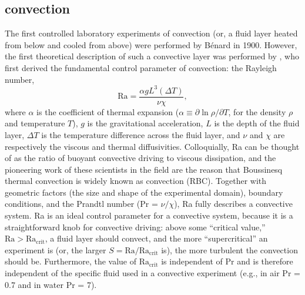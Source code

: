\subsection{\RB convection}
The first controlled laboratory experiments of convection (or, a fluid layer heated from below and cooled from above) were performed by B\'{e}nard in 1900.
However, the first theoretical description of such a convective layer was performed by \citet{rayleigh1916}, who first derived the fundamental control parameter of convection: the Rayleigh number,
\begin{equation}
\text{Ra} = \frac{\alpha g L^3 (\Delta T)}{\nu \chi},
\label{eqn:rayleigh_number}
\end{equation}
where $\alpha$ is the coefficient of thermal expansion ($\alpha \equiv \partial \ln \rho / \partial T$, for the density $\rho$ and temperature $T$), $g$ is the gravitational acceleration, $L$ is the depth of the fluid layer, $\Delta T$ is the temperature difference across the fluid layer, and $\nu$ and $\chi$ are respectively the viscous and thermal diffusivities.
Colloquially, Ra can be thought of as the ratio of buoyant convective driving to viscous dissipation, and the pioneering work of these scientists in the field are the reason that Boussinesq thermal convection is widely known as \RB convection (RBC).
Together with geometric factors (the size and shape of the experimental domain), boundary conditions, and the Prandtl number (Pr = $\nu/\chi$), Ra fully describes a convective system.
Ra is an ideal control parameter for a convective system, because it is a straightforward knob for convective driving: above some ``critical value,'' $\text{Ra} > \text{Ra}_{\text{crit}}$, a fluid layer should convect, and the more ``supercritical'' an experiment is (or, the larger $S = \text{Ra}/\text{Ra}_{\text{crit}}$ is), the more turbulent the convection should be.
Furthermore, the value of $\text{Ra}_{\text{crit}}$ is independent of $\text{Pr}$ and is therefore independent of the specific fluid used in a convective experiment (e.g., in air Pr = 0.7 and in water Pr = 7).


